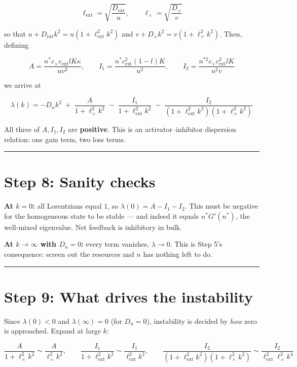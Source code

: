 \documentclass[11pt]{article}
\begin{document}
\[
\ell_{\text{ext}} = \sqrt{\frac{D_{\text{ext}}}{u}}, \qquad \ell_\times = \sqrt{\frac{D_\times}{v}}
\]

so that $u + D_{\text{ext}}k^2 = u\left(1+\ell_{\text{ext}}^2k^2\right)$ and $v+D_\times k^2 = v\left(1+\ell_\times^2k^2\right)$. Then, defining

\[
A = \frac{n^*c_\times c_{\text{ext}}lK\kappa}{uv^2}, \qquad I_1 = \frac{n^*c_{\text{ext}}^2(1-l)K}{u^2}, \qquad I_2 = \frac{n^{*2}c_\times c_{\text{ext}}^2lK}{u^2v}
\]

we arrive at

\[
\boxed{\;\lambda(k) = -D_nk^2 \;+\; \frac{A}{1+\ell_\times^2k^2} \;-\; \frac{I_1}{1+\ell_{\text{ext}}^2k^2} \;-\; \frac{I_2}{\left(1+\ell_{\text{ext}}^2k^2\right)\left(1+\ell_\times^2k^2\right)}\;}
\]

All three of $A, I_1, I_2$ are \textbf{positive}. This is an activator--inhibitor dispersion relation: one gain term, two loss terms.

\bigskip\hrule\bigskip

\section*{Step 8: Sanity checks}

\textbf{At $k=0$:} all Lorentzians equal $1$, so $\lambda(0) = A - I_1 - I_2$. This must be negative for the homogeneous state to be stable --- and indeed it equals $n^*G'(n^*)$, the well-mixed eigenvalue. Net feedback is inhibitory in bulk.

\textbf{At $k\to\infty$ with $D_n=0$:} every term vanishes, $\lambda\to 0$. This is Step 5's consequence: screen out the resources and $n$ has nothing left to do.

\bigskip\hrule\bigskip

\section*{Step 9: What drives the instability}

Since $\lambda(0)<0$ and $\lambda(\infty)=0$ (for $D_n=0$), instability is decided by \emph{how} zero is approached. Expand at large $k$:

\[
\frac{A}{1+\ell_\times^2k^2} \sim \frac{A}{\ell_\times^2k^2}, \qquad \frac{I_1}{1+\ell_{\text{ext}}^2k^2}\sim\frac{I_1}{\ell_{\text{ext}}^2k^2}, \qquad \frac{I_2}{(1+\ell_{\text{ext}}^2k^2)(1+\ell_\times^2k^2)} \sim \frac{I_2}{\ell_{\text{ext}}^2\ell_\times^2 k^4}
\]
\end{document}
